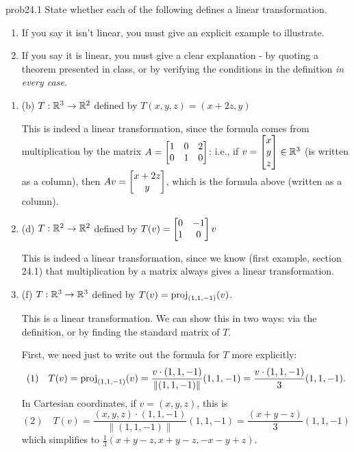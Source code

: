 
\begin{sol}{prob24.1} State whether each of the following defines a linear transformation.    
   \smallskip    
\begin{enumerate}[$\bullet$]
\item If you say it isn't linear, you must give an explicit example to illustrate.   
\item If you say it is linear, you must give a clear explanation -   by quoting a theorem presented in class, or by verifying the conditions in the definition {\it  in every  case}. 
\end{enumerate}
\medskip
\begin{enumerate}[]


\item (b) $T:\mathbb{R}^3 \to \mathbb{R}^2$ defined by $T(x,y,z)=(x+ 2 z, y)$

\soln This is indeed a linear transformation, since the formula comes from multiplication by the matrix $A=\bmatrix 1&0&2\\0&1&0 \endbmatrix$: i.e., if $v=\bmatrix x\\y\\z\\ \endbmatrix \in \R^3$ (is written as a column), then $Av=\bmatrix x+2z\\y \endbmatrix$, which is the formula above (written as a column).
\medskip



\item (d) $T:\mathbb{R}^2 \to \mathbb{R}^2$ defined by $T(v)=\bmatrix 0&-1\\ 1&0 \endbmatrix v$

\soln This is indeed a linear transformation, since we know  (first example, section 24.1) that multiplication by a matrix always gives a linear transformation.
\medskip
%



\item (f) $T:\mathbb{R}^3 \to \mathbb{R}^3$ defined by $T(v)= \operatorname{proj}_{(1,1,-1)}(v)$.

\soln This is a linear transformation. We can show this in two ways: via the definition, or by finding the standard matrix of $T$.

First, we need just to write out the formula for $T$ more explicitly: $$ (1)\quad T(v)= \operatorname{proj}_{(1,1,-1)}(v)=\dfrac{v\cdot (1,1,-1)}{\|(1,1,-1)\|}(1,1,-1)=\dfrac{v\cdot (1,1,-1)}{3}(1,1,-1).$$ In Cartesian coordinates,  if $v=(x,y,z)$,   this is
$$(2)\quad T(v)=  \dfrac{(x,y,z)\cdot (1,1,-1)}{\|(1,1,-1)\|}(1,1,-1)= \dfrac{ (x+y-z )}{3}(1,1,-1)$$ which simplifies to $\frac13(x+y-z,x+y-z,-x-y+z).$


\end{enumerate}
\end{sol}
